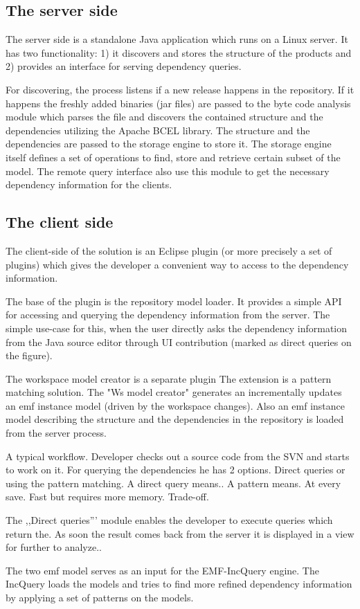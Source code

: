 \subsection{The server side}
The server side is a standalone Java application which runs on a Linux server.
It has two functionality: 1) it discovers and stores the structure of the
products and 2) provides an interface for serving dependency queries. 

For discovering, the process listens if a new release happens in the repository.
If it happens the freshly added binaries (jar files) are passed to the byte code
analysis module which parses the file and discovers the contained structure and
the dependencies utilizing the Apache BCEL library.  The structure and the
dependencies are passed to the storage engine to store it. The storage engine
itself defines a set of operations to find, store and retrieve certain subset of
the model. The remote query interface also use this module to get the necessary 
dependency information for the clients.

\subsection{The client side}
The client-side of the solution is an Eclipse plugin (or more precisely a set of
plugins) which gives the developer a convenient way to access to the dependency
information.

The base of the plugin is the repository model loader. It provides a simple API
for accessing and querying the dependency information from the server. The
simple use-case for this, when the user directly asks the dependency information
from the Java source editor through UI contribution (marked as direct queries on
the figure).

The workspace model creator is a separate plugin 
The extension is a pattern matching solution. The "Ws model creator" generates
an incrementally updates an emf instance model (driven by the workspace
changes). Also an emf instance model describing the structure and the
dependencies in the repository is loaded from the server process.



A typical workflow. Developer checks out a source code from the SVN and starts
to work on it. For querying the dependencies he has 2 options. Direct queries or
using the pattern matching. A direct query means.. A pattern means. At every
save. Fast but requires more memory. Trade-off.


 The ,,Direct queries''' module enables the developer
to execute queries which return the. As soon the result comes back from the
server it is displayed in a view for further to analyze..



The two emf model serves as an input for the EMF-IncQuery engine. The IncQuery
loads the models and tries to find more refined dependency information by
applying a set of patterns on the models.